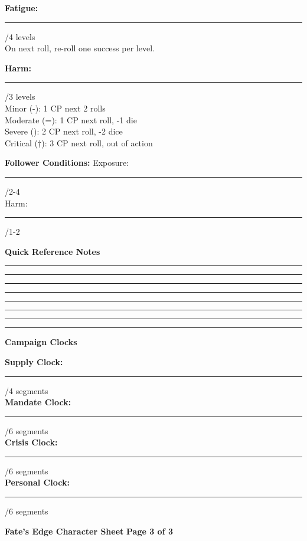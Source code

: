 \documentclass[10pt]{article}
\begin{document}
\begin{mdframed}[backgroundcolor=background, linewidth=0pt, roundcorner=5pt]
\begin{adjustwidth}{0.2cm}{0.2cm}
\vspace{0.2cm}
\textbf{Fatigue:} \rule{8cm}{0.4pt}/4 levels \\
On next roll, re-roll one success per level.

\textbf{Harm:} \rule{8cm}{0.4pt}/3 levels \\
Minor (-): 1 CP next 2 rolls \\
Moderate (=): 1 CP next roll, -1 die \\
Severe (): 2 CP next roll, -2 dice \\
Critical (†): 3 CP next roll, out of action

\textbf{Follower Conditions:}
Exposure: \rule{6cm}{0.4pt}/2-4 \\
Harm: \rule{6cm}{0.4pt}/1-2
\end{adjustwidth}

\vspace{0.3cm}

\begin{mdframed}[backgroundcolor=sectionbg, linewidth=1pt, linecolor=accentcolor, roundcorner=3pt]
\textbf{\large Quick Reference Notes}
\end{mdframed}

\begin{adjustwidth}{0.2cm}{0.2cm}
\vspace{0.2cm}
\rule{\textwidth-0.4cm}{0.4pt}
\rule{\textwidth-0.4cm}{0.4pt}
\rule{\textwidth-0.4cm}{0.4pt}
\rule{\textwidth-0.4cm}{0.4pt}
\rule{\textwidth-0.4cm}{0.4pt}
\rule{\textwidth-0.4cm}{0.4pt}
\rule{\textwidth-0.4cm}{0.4pt}
\rule{\textwidth-0.4cm}{0.4pt}
\end{adjustwidth}

\vspace{0.3cm}

\begin{mdframed}[backgroundcolor=sectionbg, linewidth=1pt, linecolor=accentcolor, roundcorner=3pt]
\textbf{\large Campaign Clocks}
\end{mdframed}

\begin{adjustwidth}{0.2cm}{0.2cm}
\vspace{0.2cm}
\textbf{Supply Clock:} \rule{3cm}{0.4pt}/4 segments \\
\textbf{Mandate Clock:} \rule{3cm}{0.4pt}/6 segments \\
\textbf{Crisis Clock:} \rule{3cm}{0.4pt}/6 segments \\
\textbf{Personal Clock:} \rule{3cm}{0.4pt}/6 segments
\end{adjustwidth}

\vspace{0.5cm}

\begin{center}
\textbf{Fate's Edge Character Sheet} \hfill \textbf{Page 3 of 3}
\end{center}

\end{mdframed}
\end{document}
